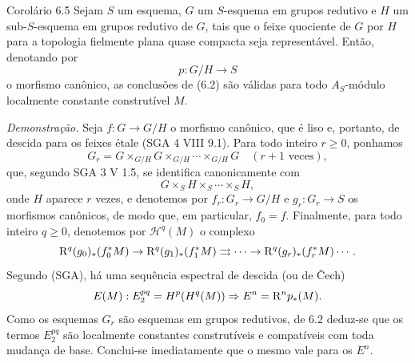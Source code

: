 \begin{statement}{Corolário 6.5}
Sejam $S$ um esquema, $G$ um $S$-esquema em grupos redutivo e $H$ um sub-$S$-esquema em grupos redutivo de $G$, tais que o feixe quociente de $G$ por $H$ para a topologia fielmente plana quase compacta seja representável. Então, denotando por
\[
p:G/H\to S
\]
o morfismo canônico, as conclusões de (6.2) são válidas para todo $A_S$-módulo localmente constante construtível $M$.
\end{statement}

\emph{Demonstração.} Seja $f:G\to G/H$ o morfismo canônico, que é liso e, portanto, de descida para os feixes étale (SGA 4 VIII 9.1). Para todo inteiro $r\ge0$, ponhamos
\[
G_r=G\times_{G/H}G\times_{G/H}\cdots\times_{G/H}G
\quad(r+1\text{ veces}),
\]
que, segundo SGA 3 V 1.5, se identifica canonicamente com
\[
G\times_S H\times_S\cdots\times_S H,
\]
onde $H$ aparece $r$ vezes, e denotemos por $f_r:G_r\to G/H$ e $g_r:G_r\to S$ os morfismos canônicos, de modo que, em particular, $f_0=f$. Finalmente, para todo inteiro $q\ge0$, denotemos por $\mathcal H^q(M)$ o complexo
\[
\mathrm{R}^q(g_0)_*(f_0^*M)\to \mathrm{R}^q(g_1)_*(f_1^*M)\rightrightarrows\cdots\to \mathrm{R}^q(g_r)_*(f_r^*M)\cdots .
\]
Segundo (SGA), há uma sequência espectral de descida (ou de Čech)
\[
E(M):E_2^{pq}=H^p(H^q(M))\Rightarrow E^n=\mathrm{R}^np_*(M).
\]
Como os esquemas $G_r$ são esquemas em grupos redutivos, de 6.2 deduz-se que os termos $E_2^{pq}$ são localmente constantes construtíveis e compatíveis com toda mudança de base. Conclui-se imediatamente que o mesmo vale para os $E^n$.
